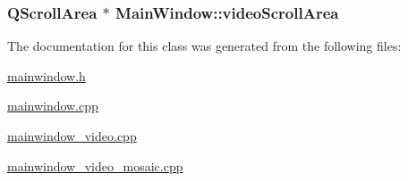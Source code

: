 \hypertarget{class_main_window_3f6296371b3123678d1615633f5debfb}{
\subsubsection[{videoScrollArea}]{\setlength{\rightskip}{0pt plus 5cm}QScrollArea $\ast$ {\bf MainWindow::videoScrollArea}}}
\label{class_main_window_3f6296371b3123678d1615633f5debfb}




The documentation for this class was generated from the following files:\begin{CompactItemize}
\item 
\hyperlink{mainwindow_8h}{mainwindow.h}\item 
\hyperlink{mainwindow_8cpp}{mainwindow.cpp}\item 
\hyperlink{mainwindow__video_8cpp}{mainwindow\_\-video.cpp}\item 
\hyperlink{mainwindow__video__mosaic_8cpp}{mainwindow\_\-video\_\-mosaic.cpp}\end{CompactItemize}
